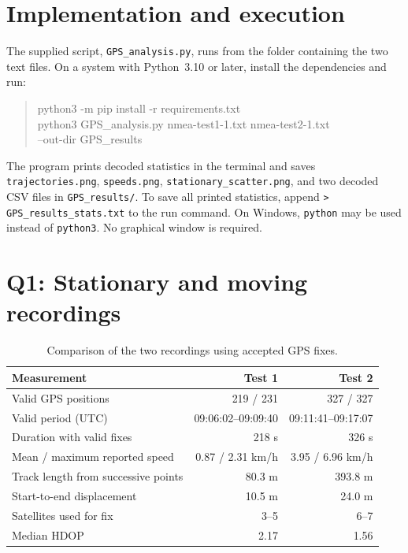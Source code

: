 \documentclass[11pt,a4paper]{article}
\newcommand{\sourcename}[1]{\texttt{#1}}
\begin{document}
\section{Implementation and execution}

The supplied script, \sourcename{GPS\_analysis.py}, runs from the folder containing the two text files. On a system with Python~3.10 or later, install the dependencies and run:
\begin{quote}
\ttfamily\small
python3 -m pip install -r requirements.txt\\
python3 GPS\_analysis.py nmea-test1-1.txt nmea-test2-1.txt\\
\hspace*{1em}--out-dir GPS\_results
\end{quote}
The program prints decoded statistics in the terminal and saves \texttt{trajectories.png}, \texttt{speeds.png}, \texttt{stationary\_scatter.png}, and two decoded CSV files in \texttt{GPS\_results/}. To save all printed statistics, append \texttt{> GPS\_results\_stats.txt} to the run command. On Windows, \texttt{python} may be used instead of \texttt{python3}. No graphical window is required.

\clearpage
\section{Q1: Stationary and moving recordings}

\begin{table}[H]
\centering
\small
\caption{Comparison of the two recordings using accepted GPS fixes.}
\begin{tabularx}{\textwidth}{@{}Xrr@{}}
\toprule
Measurement & Test 1 & Test 2 \\
\midrule
Valid GPS positions & 219 / 231 & 327 / 327 \\
Valid period (UTC) & 09:06:02--09:09:40 & 09:11:41--09:17:07 \\
Duration with valid fixes & 218 s & 326 s \\
Mean / maximum reported speed & 0.87 / 2.31 km/h & 3.95 / 6.96 km/h \\
Track length from successive points & 80.3 m & 393.8 m \\
Start-to-end displacement & 10.5 m & 24.0 m \\
Satellites used for fix & 3--5 & 6--7 \\
Median HDOP & 2.17 & 1.56 \\
\bottomrule
\end{tabularx}
\end{table}
\end{document}
